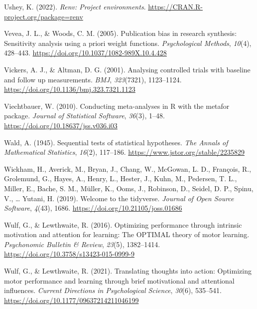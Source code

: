 \documentclass[
  man, donotrepeattitle,mask,floatsintext]{apa7}
\newlength{\cslhangindent}
\newlength{\cslentryspacingunit} %
\newenvironment{CSLReferences}[2] %
 {%
  \setlength{\parindent}{0pt}
  \ifodd #1
  \let\oldpar\par
  \def\par{\hangindent=\cslhangindent\oldpar}
  \fi
  \setlength{\parskip}{#2\cslentryspacingunit}
 }%
 {}
\begin{document}
\begin{CSLReferences}{1}{0}
\leavevmode{}%
Ushey, K. (2022). \emph{Renv: Project environments}. \url{https://CRAN.R-project.org/package=renv}

\leavevmode{}%
Vevea, J. L., \& Woods, C. M. (2005). Publication bias in research synthesis: Sensitivity analysis using a priori weight functions. \emph{Psychological Methods}, \emph{10}(4), 428--443. \url{https://doi.org/10.1037/1082-989X.10.4.428}

\leavevmode{}%
Vickers, A. J., \& Altman, D. G. (2001). Analysing controlled trials with baseline and follow up measurements. \emph{BMJ}, \emph{323}(7321), 1123--1124. \url{https://doi.org/10.1136/bmj.323.7321.1123}

\leavevmode{}%
Viechtbauer, W. (2010). Conducting meta-analyses in {R} with the {metafor} package. \emph{Journal of Statistical Software}, \emph{36}(3), 1--48. \url{https://doi.org/10.18637/jss.v036.i03}

\leavevmode{}%
Wald, A. (1945). Sequential tests of statistical hypotheses. \emph{The Annals of Mathematical Statistics}, \emph{16}(2), 117--186. \url{https://www.jstor.org/stable/2235829}

\leavevmode{}%
Wickham, H., Averick, M., Bryan, J., Chang, W., McGowan, L. D., François, R., Grolemund, G., Hayes, A., Henry, L., Hester, J., Kuhn, M., Pedersen, T. L., Miller, E., Bache, S. M., Müller, K., Ooms, J., Robinson, D., Seidel, D. P., Spinu, V., \ldots{} Yutani, H. (2019). Welcome to the {tidyverse}. \emph{Journal of Open Source Software}, \emph{4}(43), 1686. \url{https://doi.org/10.21105/joss.01686}

\leavevmode{}%
Wulf, G., \& Lewthwaite, R. (2016). Optimizing performance through intrinsic motivation and attention for learning: {The OPTIMAL} theory of motor learning. \emph{Psychonomic Bulletin \& Review}, \emph{23}(5), 1382--1414. \url{https://doi.org/10.3758/s13423-015-0999-9}

\leavevmode{}%
Wulf, G., \& Lewthwaite, R. (2021). Translating thoughts into action: Optimizing motor performance and learning through brief motivational and attentional influences. \emph{Current Directions in Psychological Science}, \emph{30}(6), 535--541. \url{https://doi.org/10.1177/09637214211046199}


\end{CSLReferences}
\end{document}
